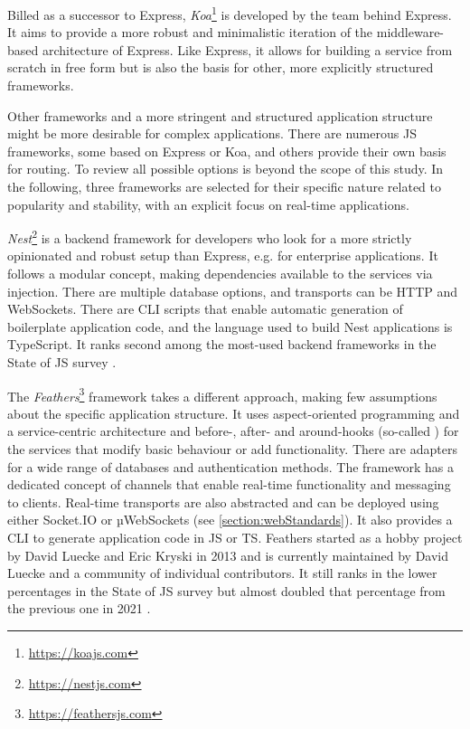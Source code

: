Billed as a successor to Express, \emph{Koa}\footnote{\url{https://koajs.com}} is developed by the team behind Express. It aims to provide a more robust and minimalistic iteration of the middleware-based architecture of Express. Like Express, it allows for building a service from scratch in free form but is also the basis for other, more explicitly structured frameworks.

Other frameworks and a more stringent and structured application structure might be more desirable for complex applications. There are numerous \ac{JS} frameworks, some based on Express or Koa, and others provide their own basis for routing. To review all possible options is beyond the scope of this study. In the following, three frameworks are selected for their specific nature related to popularity and stability, with an explicit focus on real-time applications.



\emph{Nest}\footnote{\url{https://nestjs.com}} is a backend framework for developers who look for a more strictly opinionated and robust setup than Express, e.g. for enterprise applications. It follows a modular concept, making dependencies available to the services via injection. There are multiple database options, and transports can be HTTP and WebSockets. There are \ac{CLI} scripts that enable automatic generation of boilerplate application code, and the language used to build Nest applications is TypeScript. It ranks second among the most-used backend frameworks in the State of JS survey \parencite{mostUsedBackendFrameworks22}.

The \emph{Feathers}\footnote{\url{https://feathersjs.com}} framework takes a different approach, making few assumptions about the specific application structure. It uses aspect-oriented programming and a service-centric architecture and before-, after- and around-hooks (so-called ) for the services that modify basic behaviour or add functionality. There are adapters for a wide range of databases and authentication methods. The framework has a dedicated concept of channels that enable real-time functionality and messaging to clients. Real-time transports are also abstracted and can be deployed using either Socket.IO or µWebSockets (see \autoref{section:webStandards}). It also provides a \ac{CLI} to generate application code in \ac{JS} or \ac{TS}. Feathers started as a hobby project by David Luecke and Eric Kryski in 2013 \parencite{feathersFrameworkHistory} and is currently maintained by David Luecke and a community of individual contributors. It still ranks in the lower percentages in the State of JS survey but almost doubled that percentage from the previous one in 2021 \parencite{mostUsedBackendFrameworks21}.

